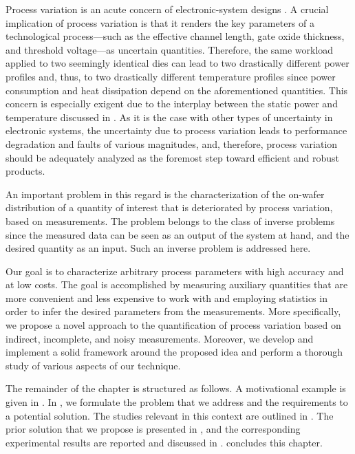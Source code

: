 Process variation is an acute concern of electronic-system designs
\cite{chandrakasan2000, srivastava2010}. A crucial implication of process
variation is that it renders the key parameters of a technological
process---such as the effective channel length, gate oxide thickness, and
threshold voltage---as uncertain quantities. Therefore, the same workload
applied to two seemingly identical dies can lead to two drastically different
power profiles and, thus, to two drastically different temperature profiles
since power consumption and heat dissipation depend on the aforementioned
quantities. This concern is especially exigent due to the interplay between the
static power and temperature \cite{liu2007, srivastava2010} discussed in
. As it is the case with other types of uncertainty in
electronic systems, the uncertainty due to process variation leads to
performance degradation and faults of various magnitudes, and, therefore,
process variation should be adequately analyzed as the foremost step toward
efficient and robust products.

An important problem in this regard is the characterization of the on-wafer
distribution of a quantity of interest that is deteriorated by process
variation, based on measurements. The problem belongs to the class of inverse
problems since the measured data can be seen as an output of the system at hand,
and the desired quantity as an input. Such an inverse problem is addressed here.

Our goal is to characterize arbitrary process parameters with high accuracy and
at low costs. The goal is accomplished by measuring auxiliary quantities that
are more convenient and less expensive to work with and employing statistics in
order to infer the desired parameters from the measurements. More specifically,
we propose a novel approach to the quantification of process variation based on
indirect, incomplete, and noisy measurements. Moreover, we develop and implement
a solid framework around the proposed idea and perform a thorough study of
various aspects of our technique.

The remainder of the chapter is structured as follows. A motivational example is
given in . In , we formulate the
problem that we address and the requirements to a potential solution. The
studies relevant in this context are outlined in . The
prior solution that we propose is presented in , and
the corresponding experimental results are reported and discussed in
.  concludes this chapter.


